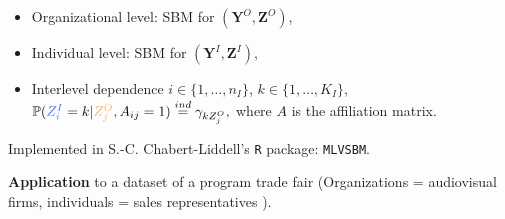 \documentclass[nopagenumber,9pt]{beamer}
\newcommand{\ZR}[1]{Z^{I}_{#1}}
\newcommand{\ZL}[1]{Z^{O}_{#1}}
\newcommand{\bZR}{\mathbf{Z}^{I}}
\newcommand{\bZL}{\mathbf{Z}^{O}}
\newcommand{\bXR}{\bY^{I}}
\newcommand{\bXL}{\bY^{O}}
\newcommand{\nbr}{n_I}
\newcommand{\aff}{A}
\newcommand{\QR}{K_I}
\renewcommand{\P}{\mathbb{P}}
\newcommand{\bY}{\mathbf{Y}}
\begin{document}
\begin{frame}
\begin{figure}

    \label{fig:vuenetwork}
\end{figure}


\begin{itemize}
 \item \color{orangeorg}Organizational level: \color{black} SBM for $(\bXL,\bZL)$,
 \item \color{blueind}Individual level: \color{black} SBM for $(\bXR,\bZR)$,
 \item Interlevel dependence $i\in\{1,\ldots,\nbr\}$, 
$k\in\{1,\ldots,\QR\}$,
$
       \P (\color{blueind}\ZR{i}\color{black}=k| \color{orangeorg} \ZL{j}\color{black}, \aff_{ij}=1)\overset{ind}{=} \gamma_{k\ZL{j}},
$ where $A$ is the affiliation matrix.
  \end{itemize}

  
  \smallskip
Implemented in S.-C. Chabert-Liddell's \texttt{R} package: \texttt{MLVSBM}.
 
 \smallskip
\textbf{Application} to a dataset of a program trade fair (Organizations = audiovisual firms, individuals = sales representatives ).
 
\end{frame}
\end{document}
